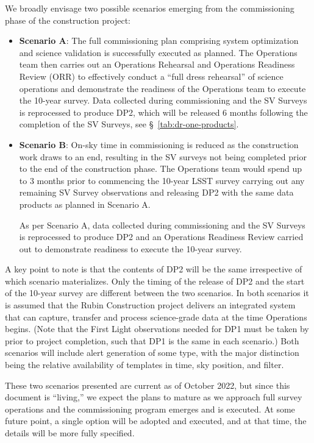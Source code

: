 We broadly envisage two possible scenarios emerging from the commissioning phase of the construction project:

\begin{itemize}
\item \textbf{Scenario A}:
The full commissioning plan comprising system optimization and science validation is successfully executed as planned.
The Operations team then carries out an Operations Rehearsal and Operations Readiness Review (ORR) to effectively conduct a ``full dress rehearsal'' of science operations and demonstrate the readiness of the Operations team to execute the 10-year survey.
Data collected during commissioning and the SV Surveys is reprocessed to produce DP2, which will be released 6 months following the completion of the SV Surveys, see \S~\ref{tab:dr-one-products}.

\item \textbf{Scenario B}:
On-sky time in commissioning is reduced as the construction work  draws to an end, resulting in the SV surveys not being completed prior to the end of the construction phase.
The Operations team would spend up to 3 months prior to commencing the 10-year LSST survey carrying out any remaining SV Survey observations and releasing DP2 with the same data products as planned in Scenario A.

As per Scenario A, data collected during commissioning and the SV Surveys is reprocessed to produce DP2 and an Operations Readiness Review carried out to demonstrate readiness to execute the 10-year survey.

\end{itemize}

A key point to note is that the contents of DP2 will be the same irrespective of which scenario materializes.
Only the timing of the release of DP2 and the start of the 10-year survey are different between the two scenarios.
In both scenarios it is assumed that the Rubin Construction project delivers an integrated system that can capture, transfer and process science-grade data at the time Operations begins.
(Note that the First Light observations needed for DP1 must be taken by prior to project completion, such that DP1 is the same in each scenario.)
Both scenarios will include alert generation of some type, with the major distinction being the relative availability of templates in time, sky position, and filter.


These two scenarios presented are current as of October 2022, but since this document is ``living,'' we expect the plans to mature as we approach full survey operations and the commissioning program emerges and is executed.
At some future point, a single option will be adopted and executed, and at that time, the details will be more fully specified.
